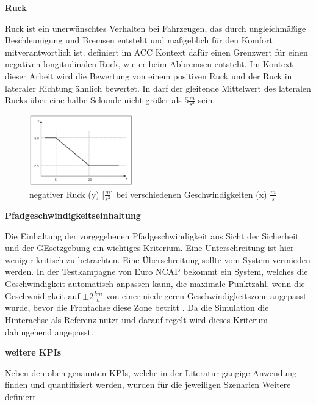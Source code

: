 \bigskip\noindent\textbf{Ruck}

\noindent Ruck ist ein unerwünschtes Verhalten bei Fahrzeugen, das durch ungleichmäßige Beschleunigung und Bremsen entsteht und maßgeblich für den Komfort mitverantwortlich ist. \cite{ISO15622} definiert im ACC Kontext dafür einen Grenzwert für einen negativen longitudinalen Ruck, wie er beim Abbremsen entsteht. Im Kontext dieser Arbeit wird die Bewertung von einem positiven Ruck und der Ruck in lateraler Richtung ähnlich bewertet. In \cite{UNECE_R79} darf der gleitende Mittelwert des lateralen Rucks über eine halbe Sekunde nicht größer als $5\frac{m}{s^{3}}$ sein.
\begin{figure}
    \centering
    \includegraphics[width=0.4\textwidth]{figures/3_Implementierung/max_neg_jerk.png}
    \caption{negativer Ruck (y) [$\frac{m}{s^{3}}$] bei verschiedenen Geschwindigkeiten (x) $\frac{m}{s}$ \cite{ISO15622}}
    \label{fig:neg_jerk}
\end{figure}

\bigskip\noindent\textbf{Pfadgeschwindigkeitseinhaltung}

\noindent Die Einhaltung der vorgegebenen Pfadgeschwindigkeit aus Sicht der Sicherheit und der GEsetzgebung ein wichtiges Kriterium. Eine Unterschreitung ist hier weniger kritisch zu betrachten. Eine Überschreitung sollte vom System vermieden werden. In der Testkampagne von Euro NCAP bekommt ein System, welches die Geschwindigkeit automatisch anpassen kann, die maximale Punktzahl, wenn die Geschwnidigkeit auf $\pm2\frac{km}{h}$ von einer niedrigeren Geschwindigkeitszone angepasst wurde, bevor die Frontachse diese Zone betritt \cite{NCAP2024}. Da die Simulation die Hinterachse als Referenz nutzt und darauf regelt wird dieses Kriterum dahingehend angepasst.

\bigskip\noindent\textbf{weitere KPIs}

\noindent Neben den oben genannten KPIs, welche in der Literatur gängige Anwendung finden und quantifiziert werden, wurden für die jeweiligen Szenarien Weitere definiert.

